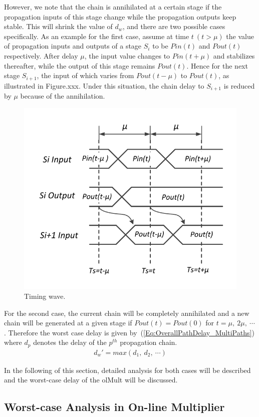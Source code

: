 \documentclass[a4paper, 11pt]{article}
\begin{document}
However, we note that the chain is annihilated at a certain stage if the propagation inputs of this stage change while the propagation outputs keep stable. This will shrink the value of $d_w$, and there are two possible cases specifically. As an example for the first case, assume at time $t~(t>\mu)$ the value of propagation inputs and outputs of a stage $S_i$ to be $Pin(t)$ and $Pout(t)$ respectively. After delay $\mu$, the input value changes to $Pin(t+\mu)$ and stabilizes thereafter, while the output of this stage remains $Pout(t)$. Hence for the next stage $S_{i+1}$, the input of which varies from $Pout(t-\mu)$ to $Pout(t)$, as illustrated in Figure.xxx. Under this situation, the chain delay to $S_{i+1}$ is reduced by $\mu$ because of the annihilation.
%
\begin{figure}[htbp]
  \centering
  \includegraphics[width=.5\textwidth]{./Figures/TimingWave.pdf}
  \caption{Timing wave.}
\end{figure}

For the second case, the current chain will be completely annihilated and a new chain will be generated at a given stage if $Pout(t)=Pout(0)$ for $t=\mu,~2\mu,~\cdots$. Therefore the worst case delay is given by~(\ref{Eq:OverallPathDelay_MultiPaths}) where $d_p$ denotes the delay of the $p^{th}$ propagation chain.
\begin{eqnarray}\label{Eq:OverallPathDelay_MultiPaths}
  d_w'=max(d_1,~d_2,~\cdots)
\end{eqnarray}

In the following of this section, detailed analysis for both cases will be described and the worst-case delay of the olMult will be discussed.

\subsection{Worst-case Analysis in On-line Multiplier}
\end{document}
